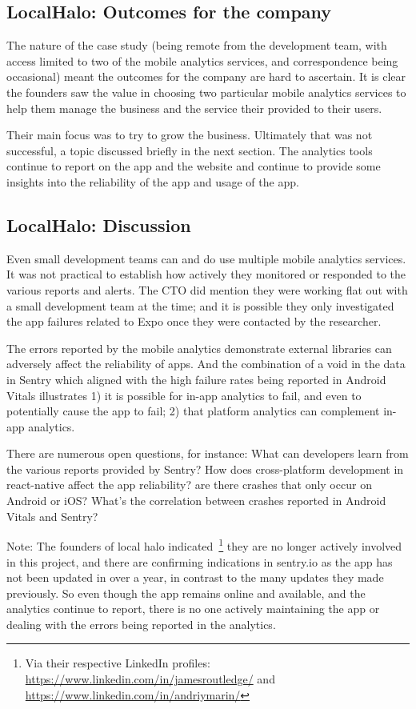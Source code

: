 \subsection{LocalHalo: Outcomes for the company}
The nature of the case study (being remote from the development team, with access limited to two of the mobile analytics services, and correspondence being occasional) meant the outcomes for the company are hard to ascertain. It is clear the founders saw the value in choosing two particular mobile analytics services to help them manage the business and the service their provided to their users. 

Their main focus was to try to grow the business. Ultimately that was not successful, a topic discussed briefly in the next section. The analytics tools continue to report on the app and the website and continue to provide some insights into the reliability of the app and usage of the app.

\subsection{LocalHalo: Discussion}
Even small development teams can and do use multiple mobile analytics services. It was not practical to establish how actively they monitored or responded to the various reports and alerts. The CTO did mention they were working flat out with a small development team at the time; and it is possible they only investigated the app failures related to Expo once they were contacted by the researcher.   

The errors reported by the mobile analytics demonstrate external libraries can adversely affect the reliability of apps. And the combination of a void in the data in Sentry which aligned with the high failure rates being reported in Android Vitals illustrates 1) it is possible for in-app analytics to fail, and even to potentially cause the app to fail; 2) that platform analytics can complement in-app analytics.

There are numerous open questions, for instance: What can developers learn from the various reports provided by Sentry? How does cross-platform development in react-native affect the app reliability? are there crashes that only occur on Android or iOS? What's the correlation between crashes reported in Android Vitals and Sentry?

Note: The founders of local halo indicated~\footnote{Via their respective LinkedIn profiles: \url{https://www.linkedin.com/in/jamesroutledge/} and \url{https://www.linkedin.com/in/andriymarin/}} they are no longer actively involved in this project, and there are confirming indications in sentry.io as the app has not been updated in over a year, in contrast to the many updates they made previously. So even though the app remains online and available, and the analytics continue to report, there is no one actively maintaining the app or dealing with the errors being reported in the analytics.

